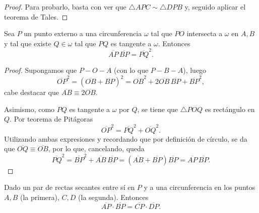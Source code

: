 \documentclass[11pt,a4paper]{book}
\begin{document}
\begin{proof}
Para probarlo, basta con ver que $\triangle APC\sim\triangle DPB$ y, seguido aplicar el teorema de Tales.
\end{proof}
\begin{thm}
Sea $P$ un punto externo a una circunferencia $\omega$ tal que $PO$ intersecta a $\omega$ en $A,B$ y tal que existe $Q\in\omega$ tal que $PQ$ es tangente a $\omega$. Entonces
	$$\overline{AP}\,\overline{BP}=\overline{PQ}^2.$$
\end{thm}
\begin{proof}
	Supongamos que $P-O-A$ (con lo que $P-B-A$), luego
	$$\overline{OP}^2=(\overline{OB}+\overline{BP})^2=\overline{OB}^2+2\overline{OB}\,\overline{BP}+\overline{BP}^2,$$
	cabe destacar que $\overline{AB}\equiv 2\overline{OB}$.

	Asimismo, como $PQ$ es tangente a $\omega$ por $Q$, se tiene que $\triangle POQ$ es rectángulo en $Q$. Por teorema de Pitágoras
	$$\overline{OP}^2=\overline{PQ}^2+\overline{OQ}^2.$$
	Utilizando ambas expresiones y recordando que por definición de círculo, se da que $\overline{OQ}\equiv\overline{OB}$, por lo que, cancelando, queda
	$$\overline{PQ}^2=\overline{BP}^2+\overline{AB}\,\overline{BP}=(\overline{AB}+\overline{BP})\overline{BP}=\overline{AP}\,\overline{BP}.$$
\end{proof}
\begin{thm}
	Dado un par de rectas secantes entre sí en $P$ y a una circunferencia en los puntos $A,B$ (la primera), $C,D$ (la segunda). Entonces
	$$\overline{AP}\cdot\overline{BP}=\overline{CP}\cdot\overline{DP}.$$
\end{thm}
\end{document}
